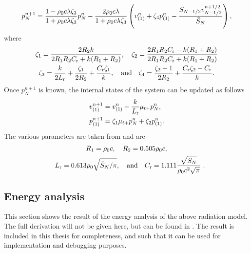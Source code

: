 {%
\begin{equation}\label{eq:pRadUpdate}
    p_N^{n+1} = \frac{1 - \rho_0c\lambda\zeta_3}{1+\rho_0c\lambda\zeta_3}p_N^n - \frac{2\rho_0c\lambda}{1+\rho_0c\lambda\zeta_3} \left( v_{(1)}^n+\zeta_4p_{(1)}^n - \frac{S_{N-1/2}v_{N-1/2}^{n+1/2}}{\bar S_N}\right),
\end{equation}
where
\begin{gather*}
    \zeta_1 = \frac{2R_2k}{2R_1R_2C_{\text{r}} + k(R_1 + R_2)}, \quad \zeta_2 = \frac{2R_1R_2C_{\text{r}} - k(R_1 + R_2)}{2R_1R_2C_{\text{r}} + k(R_1 + R_2)}\\
    \zeta_3 = \frac{k}{2L_{\text{r}}} + \frac{\zeta_1}{2R_2}+\frac{C_{\text{r}}\zeta_1}{k}, \quad \text{and} \quad \zeta_4 = \frac{\zeta_2+1}{2R_2} + \frac{C_{\text{r}}\zeta_2 - C_{\text{r}}}{k}.
\end{gather*}
Once $p_N^{n+1}$ is known, the internal states of the system can be updated as follows
\begin{subequations}
    \begin{align}
        v_{(1)}^{n+1} &= v_{(1)}^n + \frac{k}{L_{\text{r}}}\mu_{t+} p_N^n,\\
        p_{(1)}^{n+1} &= \zeta_1\mu_{t+} p_N^n + \zeta_2 p_{(1)}^n.
    \end{align}
\end{subequations}
The various parameters are taken from \cite{Harrison2018} and are
\begin{gather*}
    R_1 = \rho_0c,\quad R_2 = 0.505\rho_0c, \\
    \quad L_{\text{r}} = 0.613\rho_0\sqrt{\bar{S}_N/\pi}, \quad \text{and} \quad C_{\text{r}} = 1.111\frac{\sqrt{\bar{S}_N}}{\rho_0 c^2\sqrt{\pi}}\ .
\end{gather*}

\subsection{Energy analysis}
This section shows the result of the energy analysis of the above radiation model. The full derivation will not be given here, but can be found in \cite{Harrison2018}. The result is included in this thesis for completeness, and such that it can be used for implementation and debugging purposes.

}
